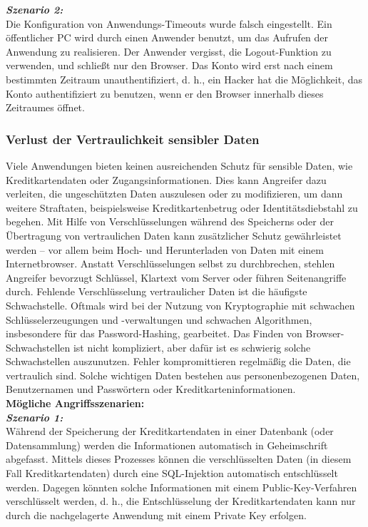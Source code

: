 \textbf{\textit{Szenario 2:}}\\
Die Konfiguration von Anwendungs-Timeouts wurde falsch eingestellt. Ein öffentlicher PC wird durch einen Anwender benutzt, um das Aufrufen der Anwendung zu realisieren. Der Anwender vergisst, die Logout-Funktion zu verwenden, und schließt nur den Browser. Das Konto wird erst nach einem bestimmten Zeitraum unauthentifiziert, d. h., ein Hacker hat die Möglichkeit, das Konto authentifiziert zu benutzen, wenn er den Browser innerhalb dieses Zeitraumes öffnet\cite{owasp13top10}.\\

\subsubsection{Verlust der Vertraulichkeit sensibler Daten}

Viele Anwendungen bieten keinen ausreichenden Schutz für sensible Daten, wie Kreditkartendaten oder Zugangsinformationen. Dies kann Angreifer dazu verleiten, die ungeschützten Daten auszulesen oder zu modifizieren, um dann weitere Straftaten, beispielsweise Kreditkartenbetrug oder Identitätsdiebstahl zu begehen. Mit Hilfe von Verschlüsselungen während des Speicherns oder der Übertragung von vertraulichen Daten kann zusätzlicher Schutz gewährleistet werden – vor allem beim Hoch- und Herunterladen von Daten mit einem Internetbrowser. Anstatt Verschlüsselungen selbst zu durchbrechen, stehlen Angreifer bevorzugt Schlüssel, Klartext vom Server oder führen Seitenangriffe durch. Fehlende Verschlüsselung vertraulicher Daten ist die häufigste Schwachstelle. Oftmals wird bei der Nutzung von Kryptographie mit schwachen Schlüsselerzeugungen und -verwaltungen und schwachen Algorithmen, insbesondere für das Password-Hashing, gearbeitet. Das Finden von Browser-Schwachstellen ist nicht kompliziert, aber dafür ist es schwierig solche Schwachstellen auszunutzen. Fehler kompromittieren regelmäßig die Daten, die vertraulich sind. Solche wichtigen Daten bestehen aus personenbezogenen Daten, Benutzernamen und Passwörtern oder  Kreditkarteninformationen\cite{owasp13top10}.\\

\textbf{Mögliche Angriffsszenarien:}\\

\textbf{\textit{Szenario 1:}}\\

Während der Speicherung der Kreditkartendaten in einer Datenbank (oder Datensammlung) werden die Informationen automatisch in Geheimschrift abgefasst. Mittels dieses Prozesses können die verschlüsselten Daten (in diesem Fall Kreditkartendaten) durch eine SQL-Injektion automatisch entschlüsselt werden. Dagegen könnten solche Informationen mit einem Public-Key-Verfahren verschlüsselt werden, d. h., die Entschlüsselung der Kreditkartendaten kann nur durch die nachgelagerte Anwendung mit einem Private Key  erfolgen\cite{owasp13top10}.\\

